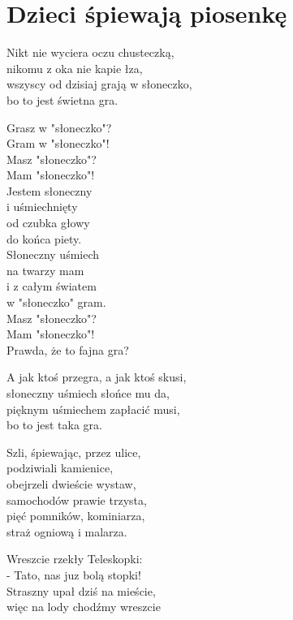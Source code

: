 \documentclass[11pt,a4pape,leqno,twoside]{book}
\begin{document}
\chapter{Dzieci śpiewają piosenkę}
Nikt nie wyciera oczu chusteczką,\\
nikomu z oka nie kapie łza,\\
wszyscy od dzisiaj grają w słoneczko,\\
bo to jest świetna gra.\\ \vspace{0.1cm}

Grasz w "słoneczko"?\\
Gram w "słoneczko"!\\
Masz "słoneczko"?\\
Mam "słoneczko"!\\
Jestem słoneczny\\
i uśmiechnięty\\
od czubka głowy\\
do końca piety.\\
Słoneczny uśmiech\\
na twarzy mam\\
i z całym światem\\
w "słoneczko" gram.\\
Masz "słoneczko"?\\
Mam "słoneczko"!\\
Prawda, że to fajna gra?\\ \vspace{0.1cm}

A jak ktoś przegra, a jak ktoś skusi,\\
słoneczny uśmiech słońce mu da,\\
pięknym uśmiechem zapłacić musi,\\
bo to jest taka gra.\\ \vspace{0.1cm}

Szli, śpiewając, przez ulice,\\
podziwiali kamienice,\\
obejrzeli dwieście wystaw,\\
samochodów prawie trzysta,\\
pięć pomników, kominiarza,\\
straż ogniową i malarza.\\ \vspace{0.1cm}

Wreszcie rzekły  Teleskopki:\\
- Tato, nas juz bolą stopki!\\
Straszny upał dziś na mieście,\\
więc na lody chodźmy wreszcie\\ \vspace{0.1cm}
\end{document}
